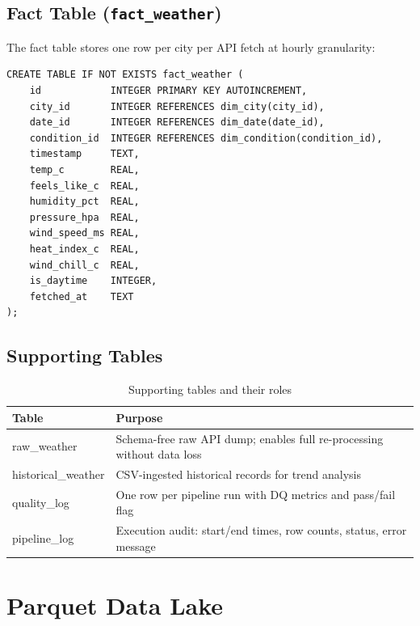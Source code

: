 \documentclass[12pt,a4paper]{report}
\begin{document}
\subsection{Fact Table (\texttt{fact\_weather})}

The fact table stores one row per city per API fetch at hourly granularity:

\begin{lstlisting}[style=sqlstyle, caption={fact\_weather DDL (excerpt)}]
CREATE TABLE IF NOT EXISTS fact_weather (
    id            INTEGER PRIMARY KEY AUTOINCREMENT,
    city_id       INTEGER REFERENCES dim_city(city_id),
    date_id       INTEGER REFERENCES dim_date(date_id),
    condition_id  INTEGER REFERENCES dim_condition(condition_id),
    timestamp     TEXT,
    temp_c        REAL,
    feels_like_c  REAL,
    humidity_pct  REAL,
    pressure_hpa  REAL,
    wind_speed_ms REAL,
    heat_index_c  REAL,
    wind_chill_c  REAL,
    is_daytime    INTEGER,
    fetched_at    TEXT
);
\end{lstlisting}

\subsection{Supporting Tables}

\begin{table}[H]
  \centering
  \caption{Supporting tables and their roles}
  \label{tab:support}
  \begin{tabular}{>{\ttfamily}l p{9cm}}
    \toprule
    \textbf{Table} & \textbf{Purpose} \\
    \midrule
    raw\_weather        & Schema-free raw API dump; enables full re-processing without data loss \\
    historical\_weather & CSV-ingested historical records for trend analysis \\
    quality\_log        & One row per pipeline run with DQ metrics and pass/fail flag \\
    pipeline\_log       & Execution audit: start/end times, row counts, status, error message \\
    \bottomrule
  \end{tabular}
\end{table}

\section{Parquet Data Lake}
\end{document}
